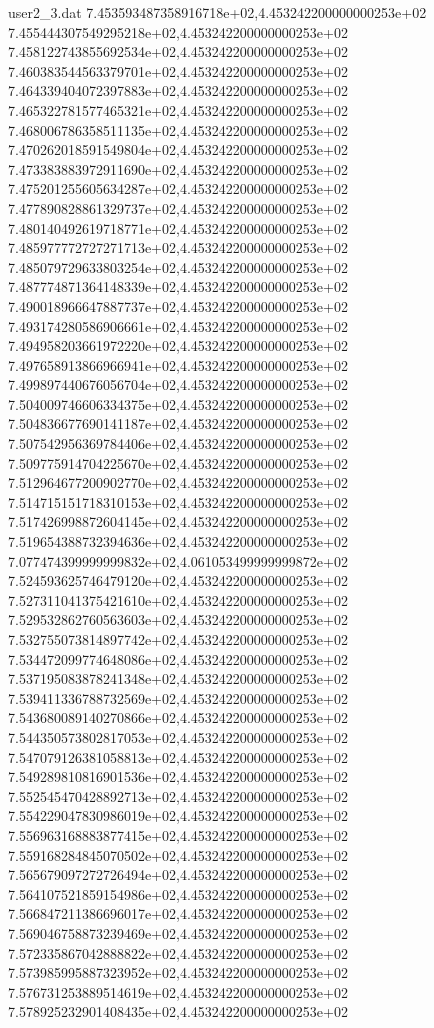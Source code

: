 \begin{filecontents}{user2_3.dat}
7.453593487358916718e+02,4.453242200000000253e+02
7.455444307549295218e+02,4.453242200000000253e+02
7.458122743855692534e+02,4.453242200000000253e+02
7.460383544563379701e+02,4.453242200000000253e+02
7.464339404072397883e+02,4.453242200000000253e+02
7.465322781577465321e+02,4.453242200000000253e+02
7.468006786358511135e+02,4.453242200000000253e+02
7.470262018591549804e+02,4.453242200000000253e+02
7.473383883972911690e+02,4.453242200000000253e+02
7.475201255605634287e+02,4.453242200000000253e+02
7.477890828861329737e+02,4.453242200000000253e+02
7.480140492619718771e+02,4.453242200000000253e+02
7.485977772727271713e+02,4.453242200000000253e+02
7.485079729633803254e+02,4.453242200000000253e+02
7.487774871364148339e+02,4.453242200000000253e+02
7.490018966647887737e+02,4.453242200000000253e+02
7.493174280586906661e+02,4.453242200000000253e+02
7.494958203661972220e+02,4.453242200000000253e+02
7.497658913866966941e+02,4.453242200000000253e+02
7.499897440676056704e+02,4.453242200000000253e+02
7.504009746606334375e+02,4.453242200000000253e+02
7.504836677690141187e+02,4.453242200000000253e+02
7.507542956369784406e+02,4.453242200000000253e+02
7.509775914704225670e+02,4.453242200000000253e+02
7.512964677200902770e+02,4.453242200000000253e+02
7.514715151718310153e+02,4.453242200000000253e+02
7.517426998872604145e+02,4.453242200000000253e+02
7.519654388732394636e+02,4.453242200000000253e+02
7.077474399999999832e+02,4.061053499999999872e+02
7.524593625746479120e+02,4.453242200000000253e+02
7.527311041375421610e+02,4.453242200000000253e+02
7.529532862760563603e+02,4.453242200000000253e+02
7.532755073814897742e+02,4.453242200000000253e+02
7.534472099774648086e+02,4.453242200000000253e+02
7.537195083878241348e+02,4.453242200000000253e+02
7.539411336788732569e+02,4.453242200000000253e+02
7.543680089140270866e+02,4.453242200000000253e+02
7.544350573802817053e+02,4.453242200000000253e+02
7.547079126381058813e+02,4.453242200000000253e+02
7.549289810816901536e+02,4.453242200000000253e+02
7.552545470428892713e+02,4.453242200000000253e+02
7.554229047830986019e+02,4.453242200000000253e+02
7.556963168883877415e+02,4.453242200000000253e+02
7.559168284845070502e+02,4.453242200000000253e+02
7.565679097272726494e+02,4.453242200000000253e+02
7.564107521859154986e+02,4.453242200000000253e+02
7.566847211386696017e+02,4.453242200000000253e+02
7.569046758873239469e+02,4.453242200000000253e+02
7.572335867042888822e+02,4.453242200000000253e+02
7.573985995887323952e+02,4.453242200000000253e+02
7.576731253889514619e+02,4.453242200000000253e+02
7.578925232901408435e+02,4.453242200000000253e+02

\end{filecontents}
